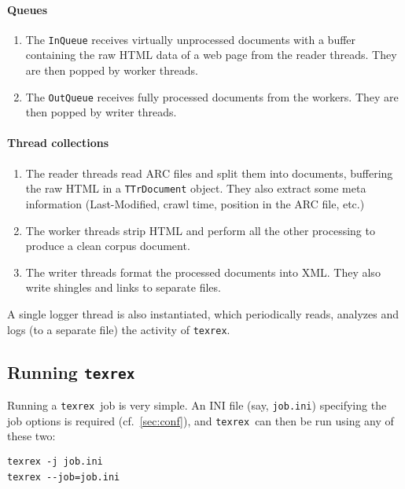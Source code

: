 \documentclass[12pt,a4paper]{article}
\newenvironment{bx}
{
  \begin{center}
  \begin{boxedminipage}[h]{0.9\textwidth}
  \small
}
{
  \end{boxedminipage}
  \end{center}
}
\newcommand{\trthis}{\texttt{texrex}}
\begin{document}
\paragraph{Queues}

\begin{enumerate}
  \item The \texttt{InQueue} receives virtually unprocessed documents with a buffer containing the raw HTML data of a web page from the reader threads.
    They are then popped by worker threads.
  \item The \texttt{OutQueue} receives fully processed documents from the workers.
    They are then popped by writer threads.
\end{enumerate}

\paragraph{Thread collections}

\begin{enumerate}
  \item The reader threads read ARC files and split them into documents, buffering the raw HTML in a \texttt{TTrDocument} object.
    They also extract some meta information (Last-Modified, crawl time, position in the ARC file, etc.)
  \item The worker threads strip HTML and perform all the other processing to produce a clean corpus document.
  \item The writer threads format the processed documents into XML.
    They also write shingles and links to separate files.
\end{enumerate}

A single logger thread is also instantiated, which periodically reads, analyzes and logs (to a separate file) the activity of \trthis.

\subsection{Running \trthis}

Running a \trthis\ job is very simple.
An INI file (say, \texttt{job.ini}) specifying the job options is required (cf.\ \ref{sec:conf}), and \trthis\ can then be run using any of these two:

\begin{bx}
\texttt{texrex -j job.ini}\\
\texttt{texrex -{-}job=job.ini}\
\end{bx}
\end{document}
